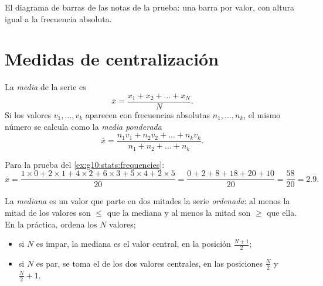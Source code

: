 \begin{omfigure}

{\small El diagrama de barras de las notas de la prueba: una barra por
valor, con altura igual a la frecuencia absoluta.}
\end{omfigure}

\section{Medidas de centralización}

\begin{definition}[Media]\label{def:g10:stats:mean}
La \emph{media} de la serie es
\[
\bar x = \frac{x_1 + x_2 + \dots + x_N}{N}.
\]
Si los valores $v_1, \dots, v_k$ aparecen con frecuencias absolutas
$n_1, \dots, n_k$, el mismo número se calcula como la \emph{media
ponderada}
\[
\bar x = \frac{n_1 v_1 + n_2 v_2 + \dots + n_k v_k}{n_1 + n_2 + \dots + n_k}.
\]
\end{definition}

\begin{example}\label{ex:g10:stats:mean}
Para la prueba del \cref{ex:g10:stats:frequencies}:
\[
\bar x = \frac{1 \times 0 + 2 \times 1 + 4 \times 2 + 6 \times 3
+ 5 \times 4 + 2 \times 5}{20}
= \frac{0 + 2 + 8 + 18 + 20 + 10}{20}
= \frac{58}{20} = 2.9 .
\]
\end{example}

\begin{definition}[Mediana]\label{def:g10:stats:median}
La \emph{mediana} es un valor que parte en dos mitades la
serie \emph{ordenada}: al menos la mitad de los valores son $\leq$ que la
mediana y al menos la mitad son $\geq$ que ella. En la práctica, ordena
los $N$ valores;
\begin{itemize}
  \item si $N$ es impar, la mediana es el valor central, en la posición
        $\frac{N+1}{2}$;
  \item si $N$ es par, se toma el  de los dos valores
        centrales, en las posiciones $\frac N2$ y $\frac N2 + 1$.
\end{itemize}
\end{definition}

